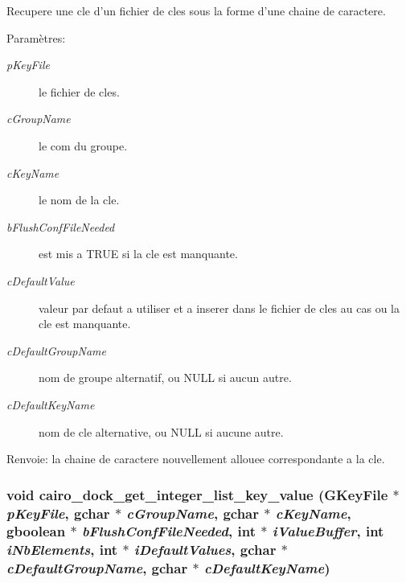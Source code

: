 Recupere une cle d'un fichier de cles sous la forme d'une chaine de caractere. \begin{Desc}
\item[Paramètres:]
\begin{description}
\item[{\em pKeyFile}]le fichier de cles. \item[{\em cGroupName}]le com du groupe. \item[{\em cKeyName}]le nom de la cle. \item[{\em bFlushConfFileNeeded}]est mis a TRUE si la cle est manquante. \item[{\em cDefaultValue}]valeur par defaut a utiliser et a inserer dans le fichier de cles au cas ou la cle est manquante. \item[{\em cDefaultGroupName}]nom de groupe alternatif, ou NULL si aucun autre. \item[{\em cDefaultKeyName}]nom de cle alternative, ou NULL si aucune autre. \end{description}
\end{Desc}
\begin{Desc}
\item[Renvoie:]la chaine de caractere nouvellement allouee correspondante a la cle. \end{Desc}
\subsubsection{\setlength{\rightskip}{0pt plus 5cm}void cairo\_\-dock\_\-get\_\-integer\_\-list\_\-key\_\-value (GKeyFile $\ast$ {\em pKeyFile}, gchar $\ast$ {\em cGroupName}, gchar $\ast$ {\em cKeyName}, gboolean $\ast$ {\em bFlushConfFileNeeded}, int $\ast$ {\em iValueBuffer}, int {\em iNbElements}, int $\ast$ {\em iDefaultValues}, gchar $\ast$ {\em cDefaultGroupName}, gchar $\ast$ {\em cDefaultKeyName})}\label{cairo-dock-config_8h_e5e434d1c4140767498dbd342d3504f2}


